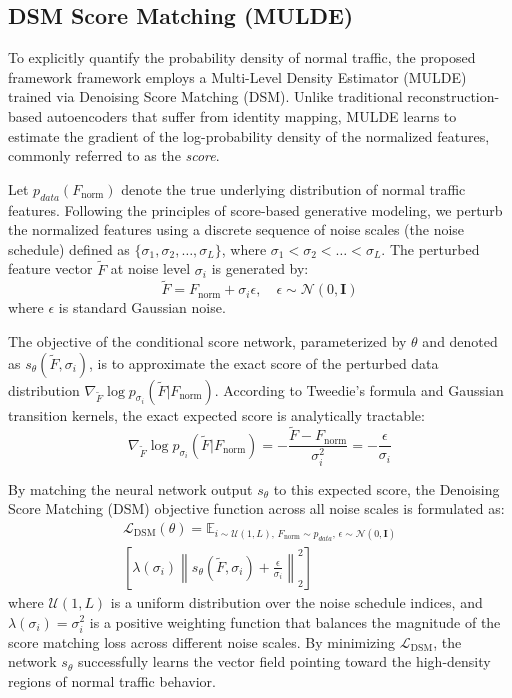 \documentclass[conference]{IEEEtran}
\begin{document}
\subsection{DSM Score Matching (MULDE)}
\label{subsec:mulde_dsm}

To explicitly quantify the probability density of normal traffic, the proposed framework framework employs a Multi-Level Density Estimator (MULDE) trained via Denoising Score Matching (DSM). Unlike traditional reconstruction-based autoencoders that suffer from identity mapping, MULDE learns to estimate the gradient of the log-probability density of the normalized features, commonly referred to as the \textit{score}.

Let $p_{data}(F_{\text{norm}})$ denote the true underlying distribution of normal traffic features. Following the principles of score-based generative modeling, we perturb the normalized features using a discrete sequence of noise scales (the noise schedule) defined as $\{\sigma_1, \sigma_2, \dots, \sigma_L\}$, where $\sigma_1 < \sigma_2 < \dots < \sigma_L$. The perturbed feature vector $\tilde{F}$ at noise level $\sigma_i$ is generated by:
\begin{equation}
\tilde{F} = F_{\text{norm}} + \sigma_i \epsilon, \quad \epsilon \sim \mathcal{N}(0, \mathbf{I})
\label{eq:perturbed_feature}
\end{equation}
where $\epsilon$ is standard Gaussian noise.

The objective of the conditional score network, parameterized by $\theta$ and denoted as $s_\theta(\tilde{F}, \sigma_i)$, is to approximate the exact score of the perturbed data distribution $\nabla_{\tilde{F}} \log p_{\sigma_i}(\tilde{F} | F_{\text{norm}})$. According to Tweedie's formula and Gaussian transition kernels, the exact expected score is analytically tractable:
\begin{equation}
\nabla_{\tilde{F}} \log p_{\sigma_i}(\tilde{F} | F_{\text{norm}}) = - \frac{\tilde{F} - F_{\text{norm}}}{\sigma_i^2} = - \frac{\epsilon}{\sigma_i}
\label{eq:expected_score}
\end{equation}

By matching the neural network output $s_\theta$ to this expected score, the Denoising Score Matching (DSM) objective function across all noise scales is formulated as:
\begin{equation}
\begin{aligned}
\mathcal{L}_{\text{DSM}}(\theta) = \mathbb{E}_{i \sim \mathcal{U}(1, L), \, F_{\text{norm}} \sim p_{data}, \, \epsilon \sim \mathcal{N}(0, \mathbf{I})} \\
\left[ \lambda(\sigma_i) \left\| s_\theta(\tilde{F}, \sigma_i) + \frac{\epsilon}{\sigma_i} \right\|_2^2 \right]
\end{aligned}
\label{eq:dsm_objective}
\end{equation}
where $\mathcal{U}(1, L)$ is a uniform distribution over the noise schedule indices, and $\lambda(\sigma_i) = \sigma_i^2$ is a positive weighting function that balances the magnitude of the score matching loss across different noise scales. By minimizing $\mathcal{L}_{\text{DSM}}$, the network $s_\theta$ successfully learns the vector field pointing toward the high-density regions of normal traffic behavior.
\end{document}
